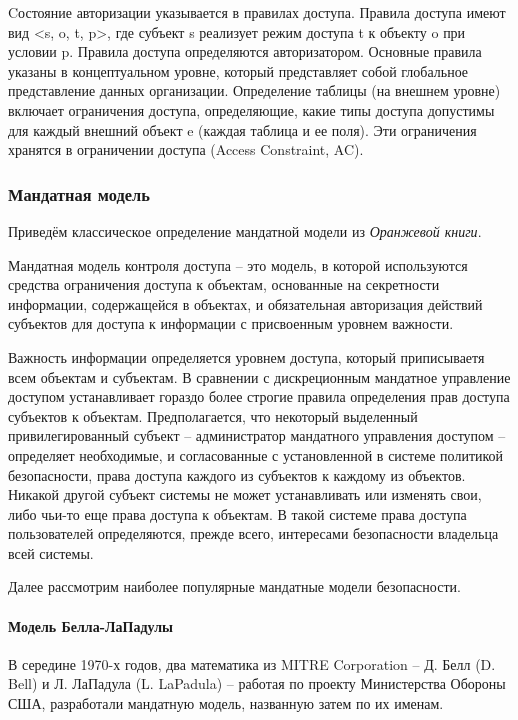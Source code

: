 Cостояние авторизации указывается в правилах доступа. Правила доступа имеют вид <s, o, t, p>, где субъект s 
реализует режим доступа t к объекту o при условии p. Правила доступа определяются авторизатором. Основные правила 
указаны в концептуальном уровне, который представляет собой глобальное представление данных организации. Определение 
таблицы (на внешнем уровне) включает ограничения доступа, определяющие, какие типы доступа допустимы для
каждый внешний объект e (каждая таблица и ее поля). Эти ограничения хранятся в ограничении доступа (Access Constraint, AC).

\subsubsection{Мандатная модель}

Приведём классическое определение мандатной модели из \textit{Оранжевой книги}.  

\begin{grayquote}
Мандатная модель контроля доступа – это модель, в которой используются средства ограничения доступа к объектам,  основанные на секретности информации,  содержащейся в объектах, и обязательная авторизация действий субъектов для доступа к информации с присвоенным уровнем важности.  
\end{grayquote}

Важность информации определяется уровнем доступа,  который приписываетя всем объектам и субъектам.  В сравнении с дискреционным мандатное управление доступом устанавливает гораздо более строгие правила определения прав доступа субъектов к объектам. Предполагается, что некоторый выделенный привилегированный субъект – администратор мандатного управления доступом – определяет необходимые, и согласованные с установленной в системе политикой безопасности, права доступа каждого из субъектов к каждому из объектов. Никакой другой субъект системы не может устанавливать или изменять свои, либо чьи-то еще права доступа к объектам. В такой системе права доступа пользователей определяются, прежде всего, интересами безопасности владельца всей системы.

Далее рассмотрим наиболее популярные мандатные модели безопасности.

\paragraph{Модель Белла-ЛаПадулы}

В середине 1970-х годов, два математика из MITRE Corporation – Д. Белл (D. Bell) и Л. ЛаПадула (L. LaPadula) – работая по проекту Министерства Обороны США, разработали мандатную модель, названную затем по их именам.

